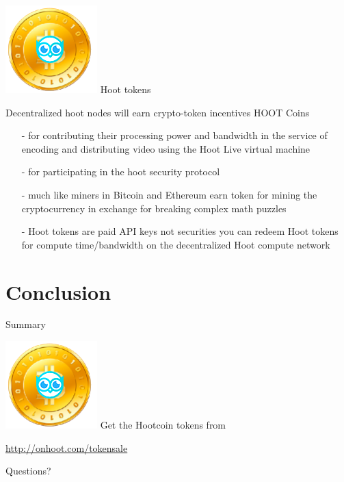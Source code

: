\documentclass[10pt]{beamer}
\begin{document}
\begin{frame}[t]{ \includegraphics[scale=0.2]{static/hootcoin} Hoot tokens }
    
    
    Decentralized hoot nodes will earn crypto-token incentives HOOT Coins 
    

    \begin{itemize}
    \item[-]for contributing their processing power and bandwidth in the service of encoding and distributing video using the Hoot Live virtual machine 
    \item[-]for participating in the hoot security protocol
    \item[-]much like miners in Bitcoin and Ethereum earn token for mining the cryptocurrency in exchange for breaking complex math puzzles
    \item[-]Hoot tokens are paid API keys not securities you can redeem Hoot tokens for compute time/bandwidth on the decentralized Hoot compute network

    \end{itemize}
    
    
    
\end{frame}

\section{Conclusion}

\begin{frame}{Summary}

\includegraphics[scale=0.5]{static/hootcoin} 
  Get the Hootcoin tokens from

  \begin{center}\url{http://onhoot.com/tokensale}\end{center}




  \begin{center}\ccbysa\end{center}

\end{frame}

\begin{frame}[standout]
  Questions?
\end{frame}
\end{document}
